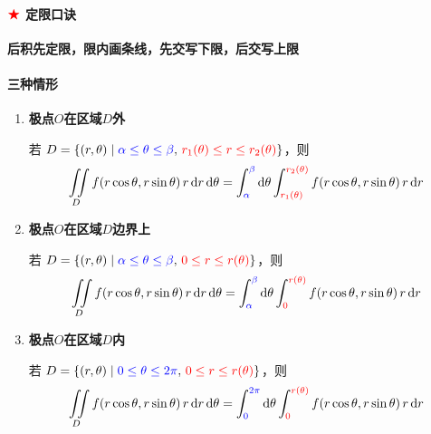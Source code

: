 \documentclass[../book.tex]{subfiles}
\begin{document}
    \vspace{0.5em}

    \paragraph{$\color{red}{\bigstar}$ 定限口诀}

    \textbf{后积先定限，限内画条线，先交写下限，后交写上限}

    \vspace{0.5em}

    \paragraph{三种情形}

    \begin{enumerate}
        \item \textbf{极点$O$在区域$D$外}

        若 $D = \{(r,\theta) \mid \textcolor{blue}{\alpha \leq \theta \leq \beta},\, \textcolor{red}{r_1(\theta) \leq r \leq r_2(\theta)}\}$，则
        \[
            \iint\limits_D f(r\cos\theta, r\sin\theta)\, r\,\mathrm{d}r\,\mathrm{d}\theta
            = \int_{\textcolor{blue}{\alpha}}^{\textcolor{blue}{\beta}} \mathrm{d}\theta \int_{\textcolor{red}{r_1(\theta)}}^{\textcolor{red}{r_2(\theta)}} f(r\cos\theta, r\sin\theta)\, r\,\mathrm{d}r
        \]

        \item \textbf{极点$O$在区域$D$边界上}

        若 $D = \{(r,\theta) \mid \textcolor{blue}{\alpha \leq \theta \leq \beta},\, \textcolor{red}{0 \leq r \leq r(\theta)}\}$，则
        \[
            \iint\limits_D f(r\cos\theta, r\sin\theta)\, r\,\mathrm{d}r\,\mathrm{d}\theta
            = \int_{\textcolor{blue}{\alpha}}^{\textcolor{blue}{\beta}} \mathrm{d}\theta \int_{\textcolor{red}{0}}^{\textcolor{red}{r(\theta)}} f(r\cos\theta, r\sin\theta)\, r\,\mathrm{d}r
        \]

        \item \textbf{极点$O$在区域$D$内}

        若 $D = \{(r,\theta) \mid \textcolor{blue}{0 \leq \theta \leq 2\pi},\, \textcolor{red}{0 \leq r \leq r(\theta)}\}$，则
        \[
            \iint\limits_D f(r\cos\theta, r\sin\theta)\, r\,\mathrm{d}r\,\mathrm{d}\theta
            = \int_{\textcolor{blue}{0}}^{\textcolor{blue}{2\pi}} \mathrm{d}\theta \int_{\textcolor{red}{0}}^{\textcolor{red}{r(\theta)}} f(r\cos\theta, r\sin\theta)\, r\,\mathrm{d}r
        \]
    \end{enumerate}
\end{document}
